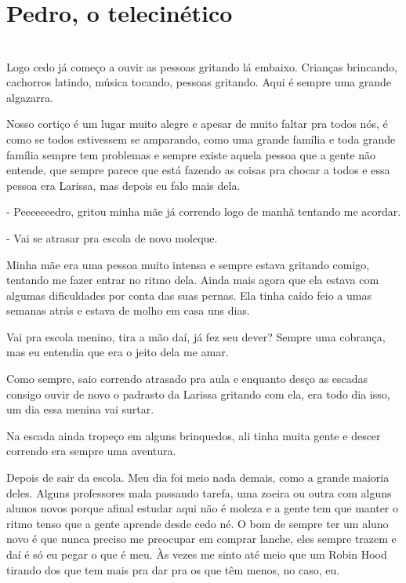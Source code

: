 \newpage


\ifdefined\useChapters
\chapter{Pedro, o telecinético}
\else
\chapter{}
\fi
Logo cedo já começo a ouvir as pessoas gritando lá embaixo. Crianças brincando, cachorros latindo, música tocando, pessoas gritando. Aqui é sempre uma grande algazarra.

Nosso cortiço é um lugar muito alegre e apesar de muito faltar pra todos nós, é como se todos estivessem se amparando, como uma grande família e toda grande família sempre tem problemas e sempre existe aquela pessoa que a gente não entende, que sempre parece que está fazendo as coisas pra chocar a todos e essa pessoa era Larissa, mas depois eu falo mais dela.

- Peeeeeeedro, gritou minha mãe já correndo logo de manhã tentando me acordar.

- Vai se atrasar pra escola de novo moleque.

Minha mãe era uma pessoa muito intensa e sempre estava gritando comigo, tentando me fazer entrar no ritmo dela. Ainda mais agora que ela estava com algumas dificuldades por conta das suas pernas. Ela tinha caído feio a umas semanas atrás e estava de molho em casa uns dias.

Vai pra escola menino, tira a mão daí, já fez seu dever? Sempre uma cobrança, mas eu entendia que era o jeito dela me amar.

Como sempre, saio correndo atrasado pra aula e enquanto desço as escadas consigo ouvir de novo o padrasto da Larissa gritando com ela, era todo dia isso, um dia essa menina vai surtar.

Na escada ainda tropeço em alguns brinquedos, ali tinha muita gente e descer correndo era sempre uma aventura.

Depois de sair da escola. Meu dia foi meio nada demais, como a grande maioria deles. Alguns professores mala passando tarefa, uma zoeira ou outra com alguns alunos novos porque afinal estudar aqui não é moleza e a gente tem que manter o ritmo tenso que a gente aprende desde cedo né. O bom de sempre ter um aluno novo é que nunca preciso me preocupar em comprar lanche, eles sempre trazem e daí é só eu pegar o que é meu. Às vezes me sinto até meio que um Robin Hood tirando dos que tem mais pra dar pra os que têm menos, no caso, eu.

